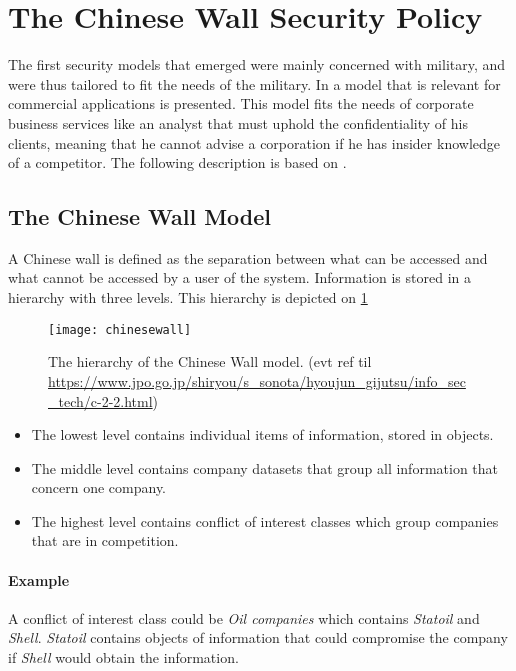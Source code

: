 \section{The Chinese Wall Security Policy}

The first security models that emerged were mainly concerned with military, and were thus tailored to fit the needs of the military. 
In \cite{brewer1989chinese} a model that is relevant for commercial applications is presented.
This model fits the needs of corporate business services like an analyst that must uphold the confidentiality of his clients, meaning that he cannot advise a corporation if he has insider knowledge of a competitor.
The following description is based on \citet{brewer1989chinese}.

\subsection*{The Chinese Wall Model}
A Chinese wall is defined as the separation between what can be accessed and what cannot be accessed by a user of the system.
Information is stored in a hierarchy with three levels. 
This hierarchy is depicted on \cref{hierarchy}

\begin{figure}
	\texttt{[image: chinesewall]}
	\caption{The hierarchy of the Chinese Wall model. (evt ref til \url{https://www.jpo.go.jp/shiryou/s_sonota/hyoujun_gijutsu/info_sec_tech/c-2-2.html})}
	\label{hierarchy}
\end{figure}

\begin{itemize}
	\item The lowest level contains individual items of information, stored in objects.
	\item The middle level contains company datasets that group all information that concern one company. 
	\item The highest level contains conflict of interest classes which group companies that are in competition.
\end{itemize}

\paragraph{Example} A conflict of interest class could be \emph{Oil companies} which contains \emph{Statoil} and \emph{Shell}. \emph{Statoil} contains objects of information that could compromise the company if \emph{Shell} would obtain the information.

